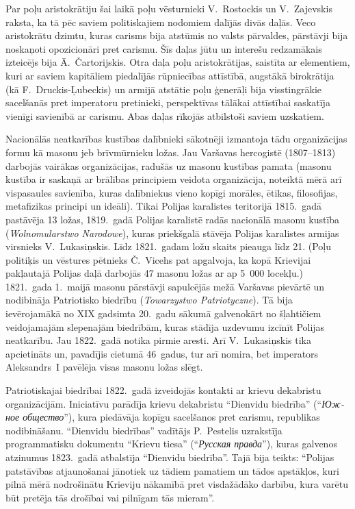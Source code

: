 \documentclass[twoside,a5paper,12pt,fleqn,openany]{extbook}
\newcommand{\pltxti}[1]{\textit{\textpolish{#1}}}
\newcommand{\rutxti}[1]{\textit{\textrussian{#1}}}
\begin{document}
Par poļu aristokrātiju šai laikā poļu vēsturnieki V.~Rostockis un V.~Zajevskis raksta, ka tā pēc saviem politiskajiem nodomiem dalījās divās daļās. Veco aristokrātu dzimtu, kuras carisms bija atstūmis no valsts pārvaldes, pārstāvji bija noskaņoti opozicionāri pret carismu. Šīs daļas jūtu un interešu redzamākais izteicējs bija Ā.~Čartorijskis. Otra daļa poļu aristokrātijas, saistīta ar elementiem, kuri ar saviem kapitāliem piedalījās rūpniecības attīstībā, augstākā birokrātija (kā F.~Druckis-Ļubeckis) un armijā atstātie poļu ģenerāļi bija visstingrākie sacelšanās pret imperatoru pretinieki, perspektīvas tālākai attīstībai saskatīja vienīgi savienībā ar carismu. Abas daļas rīkojās atbilstoši saviem uzskatiem.

Nacionālās neatkarības kustības dalībnieki sākotnēji izmantoja tādu organizācijas formu kā masonu jeb brīvmūrnieku ložas. Jau Varšavas hercogistē (1807--1813) darbojās vairākas organizācijas, radušās uz masonu kustības pamata (masonu kustība ir saskaņā ar brālības principiem veidota organizācija, noteiktā mērā arī vispasaules savienība, kuras dalībniekus vieno kopīgi morāles, ētikas, filosofijas, metafizikas principi un ideāli). Tikai Polijas karalistes teritorijā 1815.~gadā pastāvēja 13 ložas, 1819.~gadā Polijas karalistē radās nacionālā masonu kustība (\pltxti{Wolnomularstwo Narodowe}), kuras priekšgalā stāvēja Polijas karalistes armijas virsnieks V.~Lukasiņskis. Līdz 1821.~gadam ložu skaits pieauga līdz 21. (Poļu politiķis un vēstures pētnieks Č.~Vicehs pat apgalvoja, ka kopā Krievijai pakļautajā Polijas daļā darbojās 47 masonu ložas ar ap 5~000 locekļu.) 1821.~gada 1.~maijā masonu pārstāvji sapulcējās mežā Varšavas pievārtē un nodibināja Patriotisko biedrību (\pltxti{Towarzystwo Patriotyczne}). Tā bija ievērojamākā no XIX gadsimta 20.~gadu sākumā galvenokārt no šļahtičiem veidojamajām slepenajām biedrībām, kuras stādīja uzdevumu izcīnīt Polijas neatkarību. Jau 1822.~gadā notika pirmie aresti. Arī V.~Lukasiņskis tika apcietināts un, pavadījis cietumā 46~gadus, tur arī nomira, bet imperators Aleksandrs~I pavēlēja visas masonu ložas slēgt.

Patriotiskajai biedrībai 1822.~gadā izveidojās kontakti ar krievu dekabristu organizācijām. Iniciatīvu parādīja krievu dekabristu ``Dienvidu biedrība'' (``\rutxti{Южное общество}''), kura piedāvāja kopīgu sacelšanos pret carismu, republikas nodibināšanu. ``Dienvidu biedrības'' vadītājs P.~Pestelis uzrakstīja programmatisku dokumentu ``Krievu tiesa'' (``\rutxti{Русская правда}''), kuras galvenos atzinumus 1823.~gadā atbalstīja ``Dienvidu biedrība''. Tajā bija teikts: ``Polijas patstāvības atjaunošanai jānotiek uz tādiem pamatiem un tādos apstākļos, kuri pilnā mērā nodrošinātu Krieviju nākamībā pret visdažādāko darbību, kura varētu būt pretēja tās drošībai vai pilnīgam tās mieram''.
\end{document}
